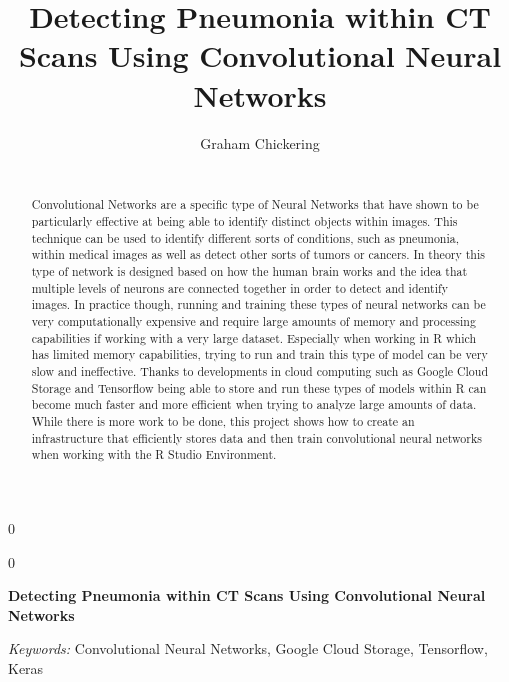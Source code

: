 \documentclass[12pt]{article}
\newcommand{\blind}{0}
\begin{document}
\def\spacingset#1{\renewcommand{\baselinestretch}%
{#1}\small\normalsize} \spacingset{1}



\blind
{
  \title{\bf Detecting Pneumonia within CT Scans Using Convolutional Neural Networks}

  \author{
        Graham Chickering \\
    \\
      }
  \maketitle
} \fi

\blind
{
  \bigskip
  \bigskip
  \bigskip
  \begin{center}
    {\LARGE\bf Detecting Pneumonia within CT Scans Using Convolutional Neural Networks}
  \end{center}
  \medskip
} \fi

\bigskip
\begin{abstract}
Convolutional Networks are a specific type of Neural Networks that have
shown to be particularly effective at being able to identify distinct
objects within images. This technique can be used to identify different
sorts of conditions, such as pneumonia, within medical images as well as
detect other sorts of tumors or cancers. In theory this type of network
is designed based on how the human brain works and the idea that
multiple levels of neurons are connected together in order to detect and
identify images. In practice though, running and training these types of
neural networks can be very computationally expensive and require large
amounts of memory and processing capabilities if working with a very
large dataset. Especially when working in R which has limited memory
capabilities, trying to run and train this type of model can be very
slow and ineffective. Thanks to developments in cloud computing such as
Google Cloud Storage and Tensorflow being able to store and run these
types of models within R can become much faster and more efficient when
trying to analyze large amounts of data. While there is more work to be
done, this project shows how to create an infrastructure that
efficiently stores data and then train convolutional neural networks
when working with the R Studio Environment.
\end{abstract}

\noindent%
{\it Keywords:} Convolutional Neural Networks, Google Cloud Storage, Tensorflow, Keras
\vfill
\end{document}
